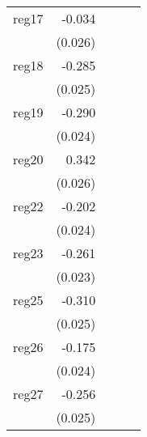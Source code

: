 {\begin{longtable}{l*{4}{D{.}{.}{-1}}}
\addlinespace
reg17       &      -0.034         &                     &                     &                     \\
            &     (0.026)         &                     &                     &                     \\
\addlinespace
reg18       &      -0.285\sym{***}&                     &                     &                     \\
            &     (0.025)         &                     &                     &                     \\
\addlinespace
reg19       &      -0.290\sym{***}&                     &                     &                     \\
            &     (0.024)         &                     &                     &                     \\
\addlinespace
reg20       &       0.342\sym{***}&                     &                     &                     \\
            &     (0.026)         &                     &                     &                     \\
\addlinespace
reg22       &      -0.202\sym{***}&                     &                     &                     \\
            &     (0.024)         &                     &                     &                     \\
\addlinespace
reg23       &      -0.261\sym{***}&                     &                     &                     \\
            &     (0.023)         &                     &                     &                     \\
\addlinespace
reg25       &      -0.310\sym{***}&                     &                     &                     \\
            &     (0.025)         &                     &                     &                     \\
\addlinespace
reg26       &      -0.175\sym{***}&                     &                     &                     \\
            &     (0.024)         &                     &                     &                     \\
\addlinespace
reg27       &      -0.256\sym{***}&                     &                     &                     \\
            &     (0.025)         &                     &                     &                     \\

\end{longtable}}
